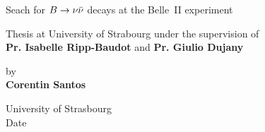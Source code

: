 \thispagestyle{empty}
\begin{center}
\huge{Seach for $B \to \nu \Bar{\nu}$ decays at the Belle~II experiment}

\vspace{0.2\textheight}
\large{Thesis at University of Strabourg under the supervision of \\ \textbf{Pr. Isabelle Ripp-Baudot} and \textbf{Pr. Giulio Dujany}}

\vspace{0.2\textheight}
\large{by \\ \textbf{Corentin Santos}}

\vspace{0.1\textheight}
\large{University of Strasbourg \\ Date}
\end{center}

\newpage
\thispagestyle{empty}

